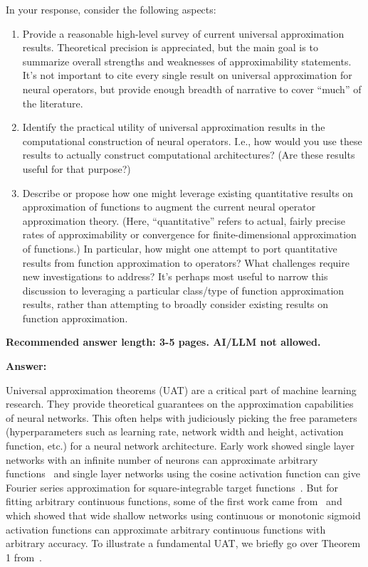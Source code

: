 \documentclass[12pt]{exam}
\begin{document}
\begin{questions}
In your response, consider the following aspects:
\begin{enumerate}
  \item Provide a reasonable high-level survey of current universal approximation results. Theoretical precision is appreciated, but the main goal is to summarize overall strengths and weaknesses of approximability statements. It's not important to cite every single result on universal approximation for neural operators, but provide enough breadth of narrative to cover ``much'' of the literature.
  \item Identify the practical utility of universal approximation results in the computational construction of neural operators. I.e., how would you use these results to actually construct computational architectures? (Are these results useful for that purpose?)
  \item Describe or propose how one might leverage existing quantitative results on approximation of functions to augment the current neural operator approximation theory. (Here, ``quantitative'' refers to actual, fairly precise rates of approximability or convergence for finite-dimensional approximation of functions.) In particular, how might one attempt to port quantitative results from function approximation to operators? What challenges require new investigations to address? It's perhaps most useful to narrow this discussion to leveraging a particular class/type of function approximation results, rather than attempting to broadly consider existing results on function approximation.
\end{enumerate}
{\bf Recommended answer length: 3-5 pages. AI/LLM not allowed.}

{\bf Answer:}

Universal approximation theorems (UAT) are a critical part of machine learning research. They provide theoretical guarantees on the approximation capabilities of neural networks. This often helps with judiciously picking the free parameters (hyperparameters such as learning rate, network width and height, activation function, etc.) for a neural network architecture. Early work showed single layer networks with an infinite number of neurons can approximate arbitrary functions~\citep{irie1988capabilities} and single layer networks using the cosine activation function can give Fourier series approximation for square-integrable target functions~\citep{gallant1988there}. But for fitting arbitrary continuous functions, some of the first work came from~\citep{cybenko1989approximation} and~\citep{hornik1989multilayer} which showed that wide shallow networks using continuous or monotonic sigmoid activation functions can approximate arbitrary continuous functions with arbitrary accuracy. To illustrate a fundamental UAT, we briefly go over Theorem 1 from~\citep{cybenko1989approximation}.

\end{questions}
\end{document}

